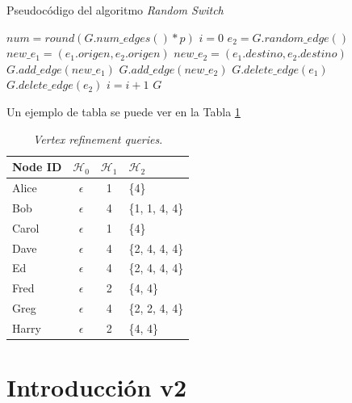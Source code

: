 \begin{algorithm}
	\caption{Pseudocódigo del algoritmo \textit{Random Switch}}
	\label{code:RandomSwitch-1}
	\begin{algorithmic}
		\STATE $num = round(G.num\_edges() * p)$
		\STATE $i = 0$
		\STATE $e_{2} = G.random\_edge()$
		\STATE $new\_e_{1} = (e_{1}.origen, e_{2}.origen)$
		\STATE $new\_e_{2} = (e_{1}.destino, e_{2}.destino)$
		\STATE $G.add\_edge(new\_e_{1})$
		\STATE $G.add\_edge(new\_e_{2})$
		\STATE $G.delete\_edge(e_{1})$
		\STATE $G.delete\_edge(e_{2})$
		\STATE $i=i+1$
		\ENDIF
		\ENDWHILE
		\RETURN $G$
	\end{algorithmic}
\end{algorithm}

Un ejemplo de tabla se puede ver en la Tabla \ref{table:ejemplo_vertex_refi_query}

\begin{table}
	\centering{}
	\begin{tabular}{ l || c | c | l }
		\hline
		Node ID & $\mathcal{H}_{0}$ & $\mathcal{H}_{1}$ & $\mathcal{H}_{2}$ \\
		\hline
		\hline
		Alice & $\epsilon$ & 1 & \{4\}  \\
		\hline
		Bob & $\epsilon$ & 4 & \{1, 1, 4, 4\}  \\
		\hline
		Carol & $\epsilon$ & 1 & \{4\}  \\
		\hline
		Dave & $\epsilon$ & 4 & \{2, 4, 4, 4\}  \\
		\hline
		Ed & $\epsilon$ & 4 & \{2, 4, 4, 4\}  \\
		\hline
		Fred & $\epsilon$ & 2 & \{4, 4\}  \\
		\hline
		Greg & $\epsilon$ & 4 & \{2, 2, 4, 4\}  \\
		\hline
		Harry & $\epsilon$ & 2 & \{4, 4\}  \\
		\hline
	\end{tabular}
	\caption{\textit{Vertex refinement queries}.}
	\label{table:ejemplo_vertex_refi_query}
\end{table}





\section{Introducción v2}

